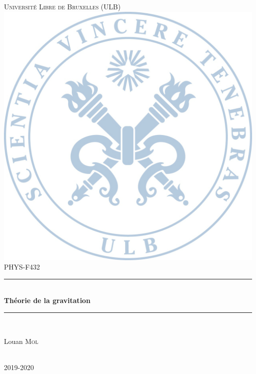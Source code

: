 \documentclass[a4paper,11pt]{report}
\theoremstyle{definition}
\theoremstyle{plain}
\theoremstyle{definition}
\theoremstyle{remark}
\newcommand{\HRule}{\rule{\linewidth}{0.5mm}}
\begin{document}
\begin{titlepage}

\center

\textsc{\LARGE Université Libre de Bruxelles (ULB)}\\[1.5cm] %
\includegraphics[scale=.1]{background.png}\\[1cm] %
\textsc{\large PHYS-F432}\\[0.5cm] %


\HRule \\[0.6cm]
{ \huge \bfseries Théorie de la gravitation}\\[0.4cm] %
\HRule \\[1.5cm]


\begin{minipage}{0.4\textwidth}
\begin{center} \large
Louan \textsc{Mol}
\end{center}

\end{minipage}\\[8cm]

{\large 2019-2020}\\[2cm] %

\vfill %

\end{titlepage}
\end{document}
